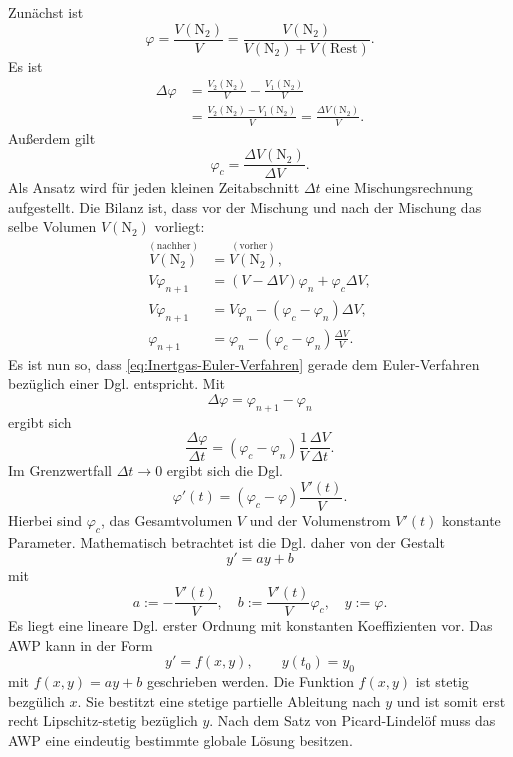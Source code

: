 \documentclass[a4paper,10pt,fleqn,twocolumn,twoside]{scrartcl}
\numberwithin{equation}{section}
\begin{document}
Zunächst ist
\begin{equation}
\varphi = \frac{V(\mathrm{N_2})}{V}
= \frac{V(\mathrm{N_2})}{V(\mathrm{N_2})+V(\mathrm{Rest})}.
\end{equation}
Es ist
\begin{equation}
\begin{split}
\Delta\varphi &= \frac{V_2(\mathrm{N_2})}{V}-\frac{V_1(\mathrm{N_2})}{V}\\
&= \frac{V_2(\mathrm{N_2})-V_1(\mathrm{N_2})}{V} = \frac{\Delta V(\mathrm{N_2})}{V}.
\end{split}
\end{equation}
Außerdem gilt
\begin{equation}
\varphi_c = \frac{\Delta V(\mathrm{N_2})}{\Delta V}.
\end{equation}
Als Ansatz wird für jeden kleinen Zeitabschnitt $\Delta t$ eine
Mischungsrechnung aufgestellt. Die Bilanz ist, dass vor der
Mischung und nach der Mischung das selbe Volumen $V(\mathrm{N_2})$
vorliegt:
\begin{align}
\overset{(\mathrm{nachher})}{V(\mathrm{N_2})} &= \overset{(\mathrm{vorher})}{V(\mathrm{N_2})},\\
V\varphi_{n+1} &= (V-\Delta V)\varphi_n +\varphi_c\Delta V,\\
V\varphi_{n+1} &= V\varphi_n-(\varphi_c-\varphi_n)\Delta V,\\
\label{eq:Inertgas-Euler-Verfahren}
\varphi_{n+1} &= \varphi_n-(\varphi_c-\varphi_n)\frac{\Delta V}{V}.
\end{align}
Es ist nun so, dass \eqref{eq:Inertgas-Euler-Verfahren} gerade
dem Euler-Verfahren bezüglich einer Dgl. entspricht. Mit
\begin{equation}
\Delta\varphi = \varphi_{n+1}-\varphi_{n}
\end{equation}
ergibt sich
\begin{equation}
\frac{\Delta\varphi}{\Delta t} = (\varphi_c-\varphi_n)\frac{1}{V}\frac{\Delta V}{\Delta t}.
\end{equation}
Im Grenzwertfall $\Delta t\to 0$ ergibt sich die Dgl.
\begin{equation}
\varphi'(t) = (\varphi_c-\varphi)\frac{V'(t)}{V}.
\end{equation}
Hierbei sind $\varphi_c$, das Gesamtvolumen $V$ und der
Volumenstrom $V'(t)$ konstante Parameter.
Mathematisch betrachtet ist die Dgl. daher von der Gestalt
\begin{equation}
y' = ay+b
\end{equation}
mit
\begin{equation}
a:=-\frac{V'(t)}{V},\quad b:=\frac{V'(t)}{V}\varphi_c,\quad y:=\varphi.
\end{equation}
Es liegt eine lineare Dgl. erster Ordnung mit konstanten
Koeffizienten vor. Das AWP kann in der Form
\begin{equation}
y' = f(x,y),\qquad y(t_0)=y_0
\end{equation}
mit $f(x,y)=ay+b$ geschrieben werden. Die Funktion $f(x,y)$
ist stetig bezgülich $x$. Sie bestitzt eine stetige partielle
Ableitung nach $y$ und ist somit erst recht Lipschitz-stetig
bezüglich $y$. Nach dem Satz von Picard-Lindelöf muss das AWP
eine eindeutig bestimmte globale Lösung besitzen.
\end{document}
